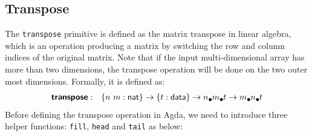 \documentclass{l4proj}
\begin{document}
\subsection{Transpose}
\label{prim:trans}
The \texttt{transpose} primitive is defined as the matrix transpose in linear algebra, which is an operation producing a matrix by switching the row and column indices of the original matrix. Note that if the input multi-dimensional array has more than two dimensions, the transpose operation will be done on the two outer most dimensions. Formally, it is defined as:
\begin{align}
    \prim{transpose}&:&\{\n~\m : \natkind\} \to \{\dt : \datatype\} \to \lArray{\n}{\lArray{\m}{\dt}} \to \lArray{\m}{\lArray{\n}{\dt}}
\end{align}
Before defining the transpose operation in Agda, we need to introduce three helper functions: \texttt{fill}, \texttt{head} and \texttt{tail} as below:
\end{document}
